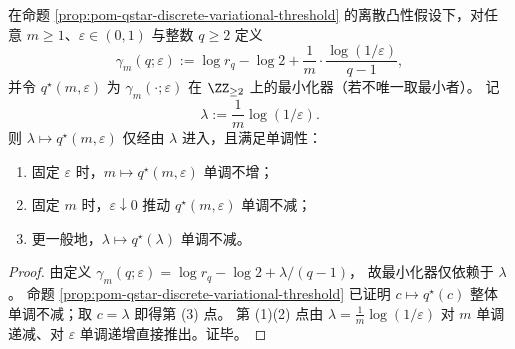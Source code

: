 \begin{corollary}\label{cor:pom-qstar-monotone-comparative-statics-m-epsilon}
在命题 \ref{prop:pom-qstar-discrete-variational-threshold} 的离散凸性假设下，对任意 \(m\ge 1\)、\(\varepsilon\in(0,1)\) 与整数 \(q\ge 2\) 定义
\[
\gamma_m(q;\varepsilon):=\log r_q-\log 2+\frac{1}{m}\cdot\frac{\log(1/\varepsilon)}{q-1},
\]
并令 \(q^\star(m,\varepsilon)\) 为 \(\gamma_m(\cdot;\varepsilon)\) 在 \(\ZZ_{\ge 2}\) 上的最小化器（若不唯一取最小者）。
记
\[
\lambda:=\frac{1}{m}\log(1/\varepsilon).
\]
则 \(\lambda\mapsto q^\star(m,\varepsilon)\) 仅经由 \(\lambda\) 进入，且满足单调性：
\begin{enumerate}
  \item 固定 \(\varepsilon\) 时，\(m\mapsto q^\star(m,\varepsilon)\) 单调不增；
  \item 固定 \(m\) 时，\(\varepsilon\downarrow 0\) 推动 \(q^\star(m,\varepsilon)\) 单调不减；
  \item 更一般地，\(\lambda\mapsto q^\star(\lambda)\) 单调不减。
\end{enumerate}
\end{corollary}
\begin{proof}
由定义
\(
\gamma_m(q;\varepsilon)=\log r_q-\log 2+\lambda/(q-1)
\)，
故最小化器仅依赖于 \(\lambda\)。
命题 \ref{prop:pom-qstar-discrete-variational-threshold} 已证明 \(c\mapsto q^\star(c)\) 整体单调不减；取 \(c=\lambda\) 即得第 (3) 点。
第 (1)(2) 点由 \(\lambda=\frac{1}{m}\log(1/\varepsilon)\) 对 \(m\) 单调递减、对 \(\varepsilon\) 单调递增直接推出。证毕。
\end{proof}



\endinput
